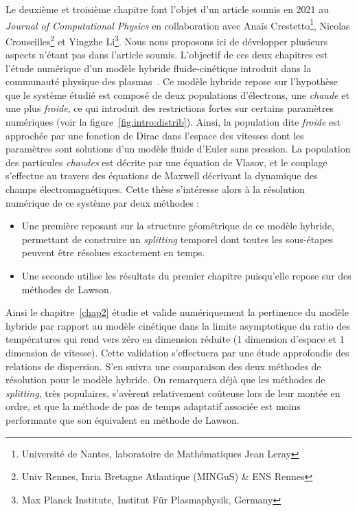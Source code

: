 Le deuxième et troisième chapitre font l'objet d'un article soumis en 2021 au \emph{Journal of Computational Physics} en collaboration avec Anaïs Crestetto\footnote{Université de Nantes, laboratoire de Mathématiques Jean Leray}, Nicolas Crouseilles\footnote{Univ Rennes, Inria Bretagne Atlantique (MINGuS) \& ENS Rennes} et Yingzhe Li\footnote{Max Planck Institute, Institut Für Plasmaphysik, Germany}. Nous nous proposons ici de développer plusieurs aspects n'étant pas dans l'article soumis. L'objectif de ces deux chapitres est l'étude numérique d'un modèle hybride fluide-cinétique introduit dans la communauté physique des plasmas~\cite{Holderied:2020}. Ce modèle hybride repose sur l'hypothèse que le système étudié est composé de deux populations d'électrons, une \emph{chaude} et une plus \emph{froide}, ce qui introduit des restrictions fortes sur certains paramètres numériques (voir la figure~\ref{fig:intro:distrib}). Ainsi, la population dite \emph{froide} est approchée par une fonction de Dirac dans l'espace des vitesses dont les paramètres sont solutions d'un modèle fluide d'Euler sans pression. La population des particules \emph{chaudes} est décrite par une équation de Vlasov, et le couplage s'effectue au travers des équations de Maxwell décrivant la dynamique des champs électromagnétiques. Cette thèse s'intéresse alors à la résolution numérique de ce système par deux méthodes :
\begin{itemize}
  \item Une première reposant sur la structure géométrique de ce modèle hybride, permettant de construire un \emph{splitting} temporel dont toutes les sous-étapes peuvent être résolues exactement en temps.
  \item Une seconde utilise les résultats du premier chapitre puisqu'elle repose sur des méthodes de Lawson.
\end{itemize}

Ainsi le chapitre~\ref{chap2} étudie et valide numériquement la pertinence du modèle hybride par rapport au modèle cinétique dans la limite asymptotique du ratio des températures qui rend vers zéro en dimension réduite (1 dimension d'espace et 1 dimension de vitesse). Cette validation s'effectuera par une étude approfondie des relations de dispersion. S'en suivra une comparaison des deux méthodes de résolution pour le modèle hybride. On remarquera déjà que les méthodes de \emph{splitting}, très populaires, s'avèrent relativement coûteuse lors de leur montée en ordre, et que la méthode de pas de temps adaptatif associée est moins performante que son équivalent en méthode de Lawson.

